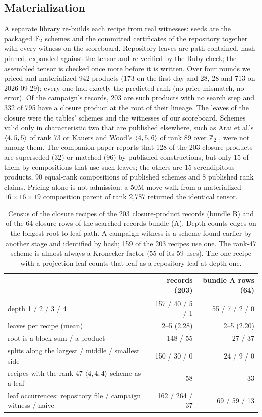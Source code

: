 \subsection{Materialization}
A separate library re-builds each recipe from real witnesses: seeds are the packaged ${\mathbb{F}_2}$ schemes and the committed certificates of the repository together with every witness on the scoreboard. Repository leaves are path-contained, hash-pinned, expanded against the tensor
and re-verified by the Ruby check; the assembled tensor is checked once more before it is written. Over four rounds we priced and materialized 942 products (173 on the first day and 28, 28 and 713 on 2026-09-29); every one had exactly the predicted rank (no price mismatch, no error).
Of the campaign's records, 203 are such products with no search step and 332 of 795 have a closure product at the root of their lineage.
The leaves of the closure were the tables' schemes and the witnesses of our scoreboard. Schemes valid only in characteristic two that are published elsewhere, such as Arai et al.'s $\langle 4,5,5\rangle$ of rank 73 \cite{arai2024adaptive} or Kauers and Wood's $\langle 4,5,6\rangle$ of rank 89 over $\mathbb Z_2$ \cite{kauers2025meta}, were not among them. The companion paper reports that 128 of the 203 closure products are superseded (32) or matched (96) by published constructions, but only 15 of them by compositions that use such leaves; the others are 15 serendipitous products, 90 equal-rank compositions of published schemes and 8 published rank claims.
Pricing alone is not admission: a 50M-move walk from a materialized $16\times16\times19$ composition parent of rank 2{,}787 returned the identical tensor.

\begin{table}[t]
\centering\small
\begin{tabular}{@{}p{7.2cm}rr@{}}
\toprule
& records (203) & bundle A rows (64)\\
\midrule
depth 1 / 2 / 3 / 4 & 157 / 40 / 5 / 1 & 55 / 7 / 2 / 0\\
leaves per recipe (mean) & 2--5 (2.28) & 2--5 (2.20)\\
root is a block sum / a product & 148 / 55 & 27 / 37\\
splits along the largest / middle / smallest side & 150 / 30 / 0 & 24 / 9 / 0\\
recipes with the rank-47 $\langle 4,4,4\rangle$ scheme as a leaf & 58 & 33\\
leaf occurrences: repository file / campaign witness / naive & 162 / 264 / 37 & 69 / 59 / 13\\
\bottomrule
\end{tabular}
\caption{Census of the closure recipes of the 203 closure-product records (bundle B) and of the 64 closure rows of the searched-records bundle (A). Depth counts edges on the longest root-to-leaf path. A campaign witness is a scheme found earlier by another stage and identified by hash; 159 of the 203 recipes use one.
The rank-47 scheme is almost always a Kronecker factor (55 of its 59 uses). The one recipe with a projection leaf counts that leaf as a repository leaf at depth one.}
\label{tab:recipes}
\end{table}


